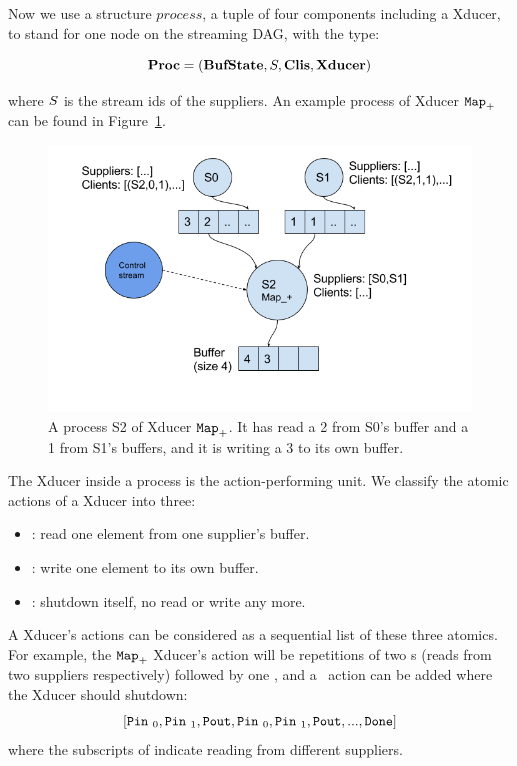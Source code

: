 Now we use a structure $process$, a tuple of four components including a Xducer, to stand for one node on the streaming DAG, with the type:

$$ \proc  =  (\bufst, \S, \clis, \xducer) $$

where $\S$ is the stream ids of the suppliers. An example process of Xducer $\map{+}$ can be found in Figure~\ref{fig:process}.

\begin{figure}
	\centering
	\includegraphics[width=1.0\textwidth]{fig/process}
	\caption{A process S2 of Xducer $\map{+}$. 
		It has read a 2 from S0's buffer and a 1 from S1's buffers, and it is writing a 3 to its own buffer.}
	\label{fig:process}
\end{figure}

The Xducer inside a process is the action-performing unit. 
We classify the atomic actions of a Xducer into three:
\begin{itemize}
	\item \pin: read one element from one supplier's buffer.
	\item \pout : write one element to its own buffer.
	\item \done: shutdown itself, no read or write any more.
\end{itemize}

A Xducer's actions can be considered as a sequential list of these three atomics.
For example,  the $\map{+}$ Xducer's action will be repetitions of two \pin s (reads from two suppliers respectively) followed by one \pout, and 
a \done \ action can be added where the Xducer should shutdown:
$$[\pin_0, \pin_1, \pout, \pin_0, \pin_1, \pout,... ,\done]$$
 where the subscripts of \pin indicate reading from different suppliers.

